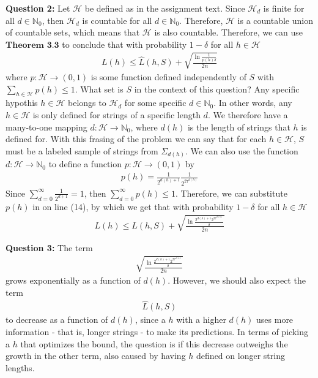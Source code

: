 \textbf{Question 2:} Let $\mathcal{H}$ be defined as in the assignment text. Since $\mathcal{H}_d$ is finite for all $d\in \mathbb{N}_0$, then $\mathcal{H}_d$ is countable for all $d\in \mathbb{N}_0$. Therefore, $\mathcal{H}$ is a countable union of countable sets, which means that $\mathcal{H}$ is also countable. Therefore, we can use $\textbf{Theorem 3.3}$ to conclude that with probability $1 - \delta$ for all $h \in \mathcal{H}$
\begin{align}
L(h) \leq \hat{L}(h,S) + \sqrt{\frac{\ln \frac{1}{p(h)\delta}}{2n}}
\end{align}
where $p: \mathcal{H} \to (0,1)$ is some function defined independently of $S$ with $\sum_{h \in \mathcal{H}}p(h) \leq 1$. What set is $S$ in the context of this question? Any specific hypothis $h\in \mathcal{H}$ belongs to $\mathcal{H}_d$ for some specific $d\in \mathbb{N}_0$. In other words, any $h\in \mathcal{H}$ is only defined for strings of a specific length $d$. We therefore have a many-to-one mapping $d: \mathcal{H} \to \mathbb{N}_0$, where $d(h)$ is the length of strings that $h$ is defined for. With this frasing of the problem we can say that for each $h\in \mathcal{H}$, $S$ must be a labeled sample of strings from $\Sigma_{d(h)}$. We can also use the function $d: \mathcal{H} \to \mathbb{N}_0$ to define a function $p: \mathcal{H} \to (0,1)$ by
\begin{align}
p(h)=\frac{1}{2^{d(h) + 1}}\frac{1}{2^{27^{d(h)}}}
\end{align}
Since $\sum_{d=0}^\infty \frac{1}{2^{d+1}}=1$, then $\sum_{d=0}^\infty p(h) \leq 1$. Therefore, we can substitute $p(h)$ in on line (14), by which we get that with probability $1 - \delta$ for all $h \in \mathcal{H}$
\begin{align}
L(h) \leq \hat{L}(h,S) + \sqrt{\frac{\ln \frac{2^{d(h) + 1} 2^{27^{d(h)}}}{\delta}}{2n}}
\end{align}

\textbf{Question 3:} The term 
\begin{align}
\sqrt{\frac{\ln \frac{2^{d(h) + 1} 2^{27^{d(h)}}}{\delta}}{2n}}
\end{align}
grows exponentially as a function of $d(h)$. However, we should also expect the term 
\begin{align}
\hat{L}(h,S) 
\end{align}
to decrease as a function of $d(h)$, since a $h$ with a higher $d(h)$ uses more information - that is, longer strings - to make its predictions. In terms of picking a $h$ that optimizes the bound, the question is if this decrease outweighs the growth in the other term, also caused by having $h$ defined on longer string lengths.